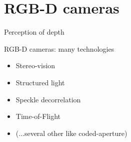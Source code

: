 \documentclass[compress]{beamer}
\begin{document}
\section{RGB-D cameras}

\begin{frame}{Perception of depth}
\end{frame}

\begin{frame}{RGB-D cameras: many technologies}
    \begin{itemize}
        \item Stereo-vision
        \item Structured light
        \item Speckle decorrelation
        \item Time-of-Flight
        \item (...several other like coded-aperture)
    \end{itemize}
\end{frame}

\end{document}
